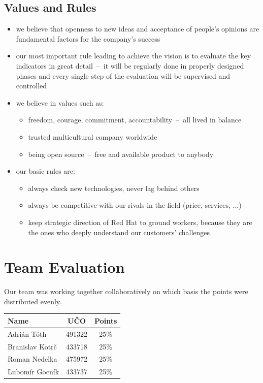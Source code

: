 \documentclass[11pt,a4paper]{article}
\begin{document}
    \subsection{Values and Rules}
    \begin{itemize}
        \item we believe that openness to new ideas and acceptance of people’s opinions are fundamental factors for the company’s success

        \item our most important rule leading to achieve the vision is to evaluate the key indicators in great detail~--~it will be regularly done in properly designed phases and every single step of the evaluation will be supervised and controlled

        \item we believe in values such as:
        \begin{itemize}
            \item freedom, courage, commitment, accountability~--~all lived in balance

            \item trusted multicultural company worldwide

            \item being open source~--~free and available product to anybody
        \end{itemize}

        \item our basic rules are:
        \begin{itemize}
            \item always check new technologies, never lag behind others

            \item always be competitive with our rivals in the field (price, services, ...)

            \item keep strategic direction of Red Hat to ground workers, because they are the ones who deeply understand our customers’ challenges
        \end{itemize}
    \end{itemize}

\newpage

\section{Team Evaluation}

Our team was working together collaboratively on which basis the points were distributed evenly.

\begin{center}
    \begin{tabular}{l|c|c}
        Name            & UČO    & Points \\
        \hline
        Adrián Tóth     & 491322 & 25\%   \\
        Branislav Kotrč & 433718 & 25\%   \\
        Roman Nedelka   & 475972 & 25\%   \\
        Ľubomír Gocník  & 433737 & 25\%   \\
    \end{tabular}
\end{center}
\end{document}

